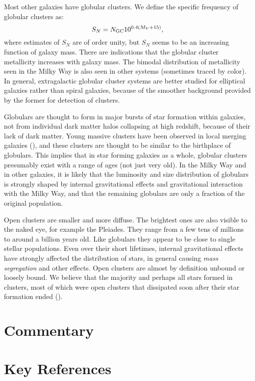 Most other galaxies have globular clusters. We define the specific
frequency of globular clusters as:
\begin{equation}
S_N = N_{\rm GC} 10^{0.4(M_V + 15)},
\end{equation}
where estimates of $S_N$ are of order unity, but $S_N$ seems to be an
increasing function of galaxy mass. There are indications that the
globular cluster metallicity increases with galaxy mass. The bimodal
distribution of metallicity seen in the Milky Way is also seen in
other systems (sometimes traced by color). In general, extragalactic
globular cluster systems are better studied for elliptical galaxies
rather than spiral galaxies, because of the smoother background
provided by the former for detection of clusters.

Globulars are thought to form in major bursts of star formation within
galaxies, not from individual dark matter halos collapsing at high
redshift, because of their lack of dark matter. Young massive clusters
have been observed in local merging galaxies (\citealt{ashman92a}),
and these clusters are thought to be similar to the birthplace of
globulars. This implies that in star forming galaxies as a whole,
globular clusters presumably exist with a range of ages (not just very
old).  In the Milky Way and in other galaxies, it is likely that the
luminosity and size distribution of globulars is strongly shaped by
internal gravitational effects and gravitational interaction with the
Milky Way, and that the remaining globulars are only a fraction of the
original population.

Open clusters are smaller and more diffuse. The brightest ones are
also visible to the naked eye, for example the Pleiades. They range
from a few tens of millions to around a billion years old. Like
globulars they appear to be close to single stellar populations. Even
over their short lifetimes, internal gravitational effects have
strongly affected the distribution of stars, in general causing {\it
mass segregation} and other effects. Open clusters are almost by
definition unbound or loosely bound. We believe that the majority and
perhaps all stars formed in clusters, most of which were open clusters
that dissipated soon after their star formation ended
(\citealt{lada03a}).

\section{Commentary}

\section{Key References}

